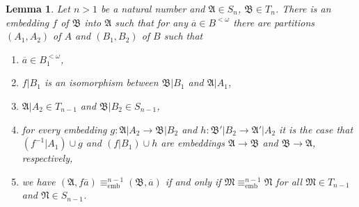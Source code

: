 \documentclass{ndjflart}
\theoremstyle{plain}
\newtheorem{lemma}[conjecture]{Lemma}
\theoremstyle{definition}
\numberwithin{equation}{section}
\DeclareMathOperator{\emb}{emb}
\begin{document}
\begin{lemma}\label{left_emb}
	Let $n>1$ be a natural number and $\mathfrak{A} \in S_n$, $\mathfrak{B}\in T_n$.
	There is an embedding $f$ of $\mathfrak{B}$ into $\mathfrak{A}$ such that for any $\overline{a} \in B^{<\omega}$ there are partitions $(A_1,A_2)$ of $A$ and $(B_1,B_2)$ of $B$ such that
	\begin{enumerate}
		\item $\overline{a} \in B_1^{<\omega}$,
		\item $f | B_1$ is an isomorphism between $\mathfrak{B} | B_1$ and $\mathfrak{A} | A_1$,
		\item $\mathfrak{A}|A_2 \in T_{n-1}$ and $\mathfrak{B}|B_2 \in S_{n-1}$,
		\item for every embedding $g \colon \mathfrak{A}|A_2\rightarrow \mathfrak{B}|B_2$ and $h \colon \mathfrak{B}' |B_2\rightarrow \mathfrak{A}'|A_2$ it is the case that $(f^{-1}|A_1) \cup g$ and $(f|B_1) \cup h$ are embeddings $\mathfrak{A} \rightarrow \mathfrak{B}$ and $\mathfrak{B} \rightarrow \mathfrak{A}$, respectively,
		\item we have $(\mathfrak{A}, f\overline{a}) \equiv^{n-1}_{\emb} (\mathfrak{B}, \overline{a})$ if and only if $\mathfrak{M} \equiv^{n-1}_{\emb} \mathfrak{N}$ for all $\mathfrak{M} \in T_{n-1}$ and $\mathfrak{N} \in S_{n-1}$.
	\end{enumerate}
\end{lemma}
\end{document}
